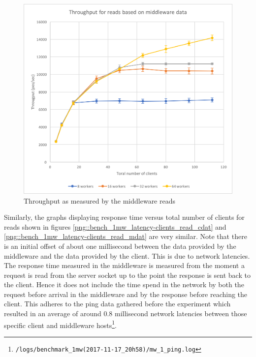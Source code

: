 \documentclass[11pt,a4paper]{article}
\begin{document}
\begin{figure}[!h]
\begin{minipage}[b]{.45\textwidth}
        \includegraphics[width=\textwidth]{processing/graphics/bench_1mw_through-clients_read_mdat.png}
        \caption{Throughput as measured by the middleware reads}
        \label{png::bench_1mw_through-clients_read_mdat}
    \end{minipage}
\end{figure}

Similarly, the graphs displaying response time versus total number of clients for reads shown in figures \ref{png::bench_1mw_latency-clients_read_cdat} and \ref{png::bench_1mw_latency-clients_read_mdat} are very similar. Note that there is an initial offset of about one millisecond between the data provided by the middleware and the data provided by the client. This is due to network latencies. The response time measured in the middleware is measured from the moment a request is read from the server socket up to the point the response is sent back to the client. Hence it does not include the time spend in the network by both the request before arrival in the middleware and by the response before reaching the client. This adheres to the ping data gathered before the experiment which resulted in an average of around 0.8 millisecond network latencies between those specific client and middleware hosts\footnote{\texttt{/logs/benchmark_1mw(2017-11-17_20h58)/mw_1_ping.log}}.
\end{document}
